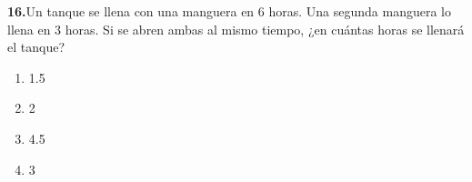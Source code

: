 \documentclass[12pt]{article}
\begin{document}
\bigskip

\noindent\textbf{16.}\quad Un tanque se llena con una manguera en 6 horas. Una segunda manguera lo llena en 3 horas. Si se abren ambas al mismo tiempo, ¿en cuántas horas se llenará el tanque?

\medskip
\begin{enumerate}[label=\Alph*), nosep, leftmargin=2cm]
\item 1.5
\item 2
\item 4.5
\item 3
\end{enumerate}

\end{document}
